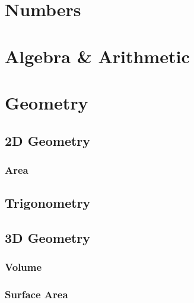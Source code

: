 
\chapter{Numbers}
\chapter{Algebra \& Arithmetic}
\chapter{Geometry}
\section{2D Geometry}
\subsection{Area}
\section{Trigonometry}
\section{3D Geometry}
\subsection{Volume}
\subsection{Surface Area}

